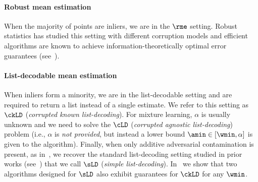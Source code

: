 \paragraph{Robust mean estimation}

When the majority of points are inliers, we are in the \(\rme\) setting. Robust statistics has studied this setting with different corruption models and efficient algorithms are known to achieve information-theoretically optimal error guarantees (see~).
\paragraph{List-decodable mean estimation}
When inliers form a minority, we are in the list-decodable setting and are required to return a list instead of a single estimate. 
We refer to this setting as \(\ckLD\) (\textit{corrupted known list-decoding}). For mixture learning, $\alpha$ is usually unknown and we need to solve the \(\cLD\) (\emph{corrupted agnostic list-decoding}) problem (i.e., \(\alpha\) is \emph{not provided}, but instead a lower bound \(\amin \in [\wmin, \alpha]\) is given to the algorithm).
Finally, when only additive adversarial contamination is present, as in~, 
we recover the standard list-decoding setting studied in prior works (see~) that we call \(\sLD\) (\textit{simple list-decoding}).
In~ we show that two
algorithms designed for \(\sLD\) also exhibit guarantees for \(\ckLD\) for any $\wmin$. 

